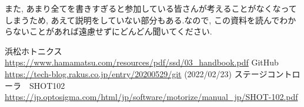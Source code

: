 \documentclass[uplatex,10pt,a4j]{jsarticle}
\begin{document}
また, あまり全てを書きすぎると参加している皆さんが考えることがなくなってしまうため, あえて説明をしていない部分もある.なので, この資料を読んでわからないことがあれば遠慮せずにどんどん聞いてください.

\begin{thebibliography}{9}
  浜松ホトニクス\\
  \url{https://www.hamamatsu.com/resources/pdf/ssd/03_handbook.pdf}
  GitHub\\
  \url{https://tech-blog.rakus.co.jp/entry/20200529/git} (2022/02/23)
  ステージコントローラ　SHOT102\\
  \url{https://jp.optosigma.com/html/jp/software/motorize/manual_jp/SHOT-102.pdf}
\end{thebibliography}
\end{document}
